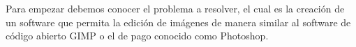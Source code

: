 Para empezar debemos conocer el problema a resolver, el cual es la creación de un
 software que permita la edición de imágenes de manera similar al software de código
  abierto GIMP o el de pago conocido como Photoshop.
